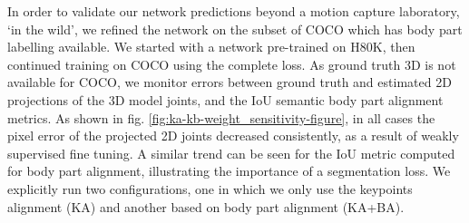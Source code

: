 \documentclass[runningheads]{llncs}
\begin{document}
  In order to validate our network predictions beyond a motion capture laboratory, `in the wild', we refined the network on the subset of COCO which has body part labelling available. We started with a network pre-trained on H80K, then continued training on COCO using the complete loss. As ground truth 3D is not available for COCO, we monitor errors between ground truth and estimated 2D projections of the 3D model joints, and the IoU semantic body part alignment metrics. As shown in fig. \ref{fig:ka-kb-weight_sensitivity-figure}, in all cases the pixel error of the projected 2D joints decreased consistently, as a result of weakly supervised fine tuning. A similar trend can be seen for the IoU metric computed for body part alignment, illustrating the importance of a segmentation loss. We explicitly run two configurations, one in which we only use the keypoints alignment (KA) and another based on body part alignment (KA+BA). 
\end{document}
